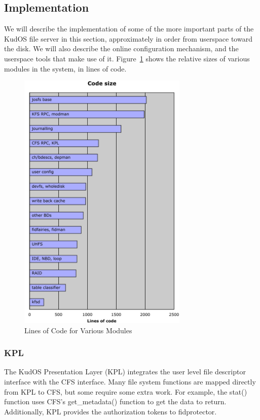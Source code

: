 \subsection{Implementation}
\label{sec:solution:impl}

We will describe the implementation of some of the more important parts of the
KudOS file server in this section, approximately in order from userspace toward
the disk. We will also describe the online configuration mechanism, and the
userspace tools that make use of it. Figure~\ref{fig:loc} shows the relative
sizes of various modules in the system, in lines of code.

\begin{figure}[htb]
\begin{center}
  \includegraphics[width=8.1cm]{loc_graph}
  \caption{Lines of Code for Various Modules}
  \label{fig:loc}
\end{center}
\end{figure}

\subsubsection{KPL}
\label{sec:solution:impl:kpl}

The KudOS Presentation Layer (KPL) integrates the user level file descriptor
interface with the CFS interface. Many file system functions are mapped directly
from KPL to CFS, but some require some extra work. For example, the stat()
function uses CFS's get\_metadata() function to get the data to return.
Additionally, KPL provides the authorization tokens to fidprotector.


